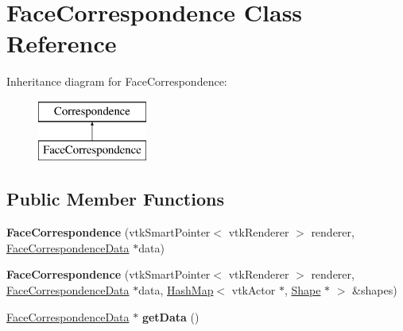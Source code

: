 \hypertarget{class_face_correspondence}{}\section{Face\+Correspondence Class Reference}
\label{class_face_correspondence}
Inheritance diagram for Face\+Correspondence\+:\begin{figure}[H]
\begin{center}
\leavevmode
\includegraphics[height=2.000000cm]{class_face_correspondence}
\end{center}
\end{figure}
\subsection*{Public Member Functions}
\begin{DoxyCompactItemize}
\item 
\hypertarget{class_face_correspondence_a1bc50409e9b90564cf20ca94fcf1f177}{}{\bfseries Face\+Correspondence} (vtk\+Smart\+Pointer$<$ vtk\+Renderer $>$ renderer, \hyperlink{class_face_correspondence_data}{Face\+Correspondence\+Data} $\ast$data)\label{class_face_correspondence_a1bc50409e9b90564cf20ca94fcf1f177}

\item 
\hypertarget{class_face_correspondence_a08368a1caf1f848f25e8cb20b5dda5b4}{}{\bfseries Face\+Correspondence} (vtk\+Smart\+Pointer$<$ vtk\+Renderer $>$ renderer, \hyperlink{class_face_correspondence_data}{Face\+Correspondence\+Data} $\ast$data, \hyperlink{class_hash_map}{Hash\+Map}$<$ vtk\+Actor $\ast$, \hyperlink{class_shape}{Shape} $\ast$ $>$ \&shapes)\label{class_face_correspondence_a08368a1caf1f848f25e8cb20b5dda5b4}

\item 
\hypertarget{class_face_correspondence_afc6dbc51848ce528a0881f5f67a6116a}{}\hyperlink{class_face_correspondence_data}{Face\+Correspondence\+Data} $\ast$ {\bfseries get\+Data} ()\label{class_face_correspondence_afc6dbc51848ce528a0881f5f67a6116a}

\end{DoxyCompactItemize}
